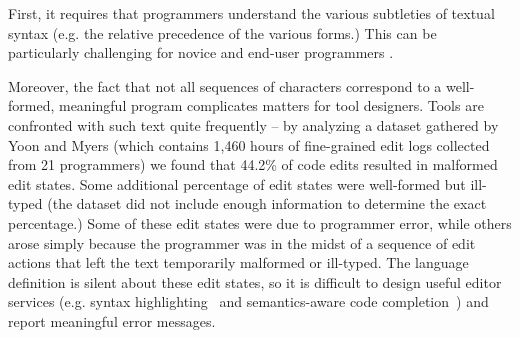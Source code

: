 

First, it requires that programmers understand the various subtleties of textual syntax (e.g. the relative precedence of the various forms.) This can be particularly challenging for novice and end-user programmers \cite{Altadmri:2015:MCI:2676723.2677258}. %

Moreover, the fact that not all sequences of characters correspond to a well-formed, meaningful program complicates matters for tool designers. Tools are confronted with such text quite frequently -- by analyzing a dataset gathered by Yoon and Myers \cite{6883030} (which contains 1,460 hours of fine-grained edit logs collected from 21 programmers) we found that 44.2\% of code edits resulted in malformed edit states. Some additional percentage of edit states were well-formed but ill-typed (the dataset did not include enough information to determine the exact percentage.)  
Some of these edit states were due to programmer error, while others arose simply because the programmer was in the midst of a sequence of edit actions that left the text temporarily malformed or ill-typed. The language definition is silent about these edit states, so it is difficult to design useful editor services (e.g. syntax highlighting~\cite{sarkar2015impact} and semantics-aware code completion~\cite{Mooty:2010:CCC:1915084.1916348}) and report meaningful error messages.

